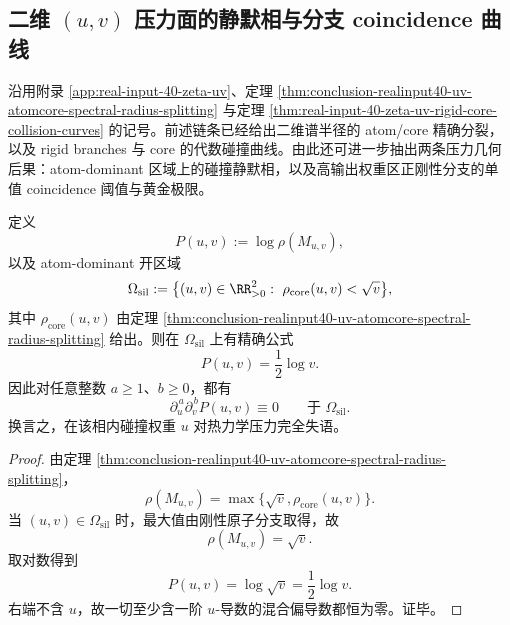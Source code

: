 \subsection{二维 \texorpdfstring{$(u,v)$}{(u,v)} 压力面的静默相与分支 coincidence 曲线}\label{subsec:conclusion-realinput40-uv-pressure-branch-geometry}
沿用附录 \ref{app:real-input-40-zeta-uv}、定理 \ref{thm:conclusion-realinput40-uv-atomcore-spectral-radius-splitting} 与定理 \ref{thm:real-input-40-zeta-uv-rigid-core-collision-curves} 的记号。前述链条已经给出二维谱半径的 atom/core 精确分裂，以及 rigid branches 与 core 的代数碰撞曲线。由此还可进一步抽出两条压力几何后果：atom-dominant 区域上的碰撞静默相，以及高输出权重区正刚性分支的单值 coincidence 阈值与黄金极限。

\begin{theorem}[二维压力面的碰撞静默相]\label{thm:conclusion-realinput40-uv-pressure-silent-phase}
定义
\[
P(u,v):=\log \rho(M_{u,v}),
\]
以及 atom-dominant 开区域
\[
\Omega_{\mathrm{sil}}
:=
\bigl\{(u,v)\in\RR_{>0}^2:\ \rho_{\mathrm{core}}(u,v)<\sqrt v\bigr\},
\]
其中 \(\rho_{\mathrm{core}}(u,v)\) 由定理 \ref{thm:conclusion-realinput40-uv-atomcore-spectral-radius-splitting} 给出。则在 \(\Omega_{\mathrm{sil}}\) 上有精确公式
\[
\boxed{\;
P(u,v)=\frac12\log v.\;}
\]
因此对任意整数 \(a\ge 1\)、\(b\ge 0\)，都有
\[
\boxed{\;
\partial_u^{\,a}\partial_v^{\,b}P(u,v)\equiv 0
\qquad \text{于 }\Omega_{\mathrm{sil}}.\;}
\]
换言之，在该相内碰撞权重 \(u\) 对热力学压力完全失语。
\end{theorem}
\begin{proof}
由定理 \ref{thm:conclusion-realinput40-uv-atomcore-spectral-radius-splitting}，
\[
\rho(M_{u,v})=\max\bigl\{\sqrt v,\rho_{\mathrm{core}}(u,v)\bigr\}.
\]
当 \((u,v)\in\Omega_{\mathrm{sil}}\) 时，最大值由刚性原子分支取得，故
\[
\rho(M_{u,v})=\sqrt v.
\]
取对数得到
\[
P(u,v)=\log\sqrt v=\frac12\log v.
\]
右端不含 \(u\)，故一切至少含一阶 \(u\)-导数的混合偏导数都恒为零。证毕。
\end{proof}

